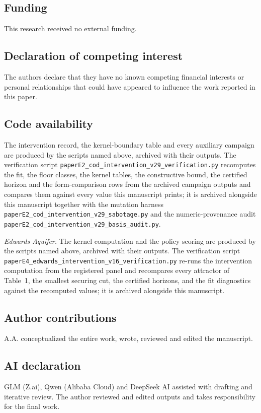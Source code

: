 \subsection*{Funding}

This research received no external funding.

\subsection*{Declaration of competing interest}

The authors declare that they have no known competing financial
interests or personal relationships that could have appeared to
influence the work reported in this paper.

\subsection*{Code availability}

The intervention record, the kernel-boundary table and every auxiliary
campaign are produced by the scripts named above, archived with their
outputs. The verification script
\texttt{paperE2\_cod\_intervention\_v29\_verification.py} recomputes the
fit, the floor classes, the kernel tables, the constructive bound, the
certified horizon and the form-comparison rows from the archived campaign
outputs and compares them against every value this manuscript prints; it
is archived alongside this manuscript together with the mutation harness
\texttt{paperE2\_cod\_intervention\_v29\_sabotage.py} and the
numeric-provenance audit
\texttt{paperE2\_cod\_intervention\_v29\_basis\_audit.py}.

\emph{Edwards Aquifer.} The kernel computation and the policy scoring are produced by the scripts
named above, archived with their outputs. The verification script
\texttt{paperE4\_edwards\_intervention\_v16\_verification.py} re-runs
the intervention computation from the registered panel and recompares
every attractor of Table~1, the smallest securing cut, the certified
horizons, and the fit diagnostics against the recomputed values; it is
archived alongside this manuscript.

\subsection*{Author contributions}
A.A. conceptualized the entire work, wrote, reviewed and edited the manuscript.

\subsection*{AI declaration}
GLM (Z.ai), Qwen (Alibaba Cloud) and DeepSeek AI assisted with drafting
and iterative review. The author reviewed and edited outputs and takes
responsibility for the final work.


